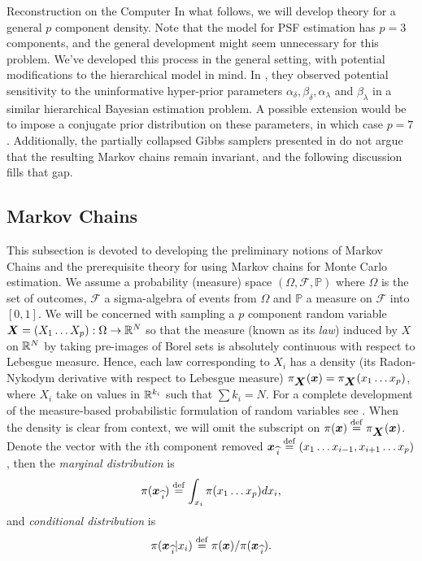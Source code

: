 \begin{chapter}{Reconstruction on the Computer}
In what follows, we will develop theory for a general $p$ component density.
Note that the model for PSF estimation has $p=3$ components, and the general development might seem unnecessary for this problem.
We've developed this process in the general setting, with potential modifications to the hierarchical model in mind.
In \citep{howard2015Sensitivity}, they observed potential sensitivity to the uninformative hyper-prior parameters $\alpha_\delta,\beta_\delta,\alpha_\lambda$ and $\beta_\lambda$ in a similar hierarchical Bayesian estimation problem.
A possible extension would be to impose a conjugate prior distribution on these parameters, in which case $p=7$.
Additionally, the partially collapsed Gibbs samplers presented in \citep{van2015metropolis,van2008partially} do not argue that the resulting Markov chains remain invariant, and the following discussion fills that gap.

  \subsection{Markov Chains}
This subsection is devoted to developing the preliminary notions of Markov Chains and the prerequisite theory for using Markov chains for Monte Carlo estimation. 
We assume a probability (measure) space $(\Omega,\mathcal F,\mathbb P)$ where $\Omega$ is the set of outcomes, $\mathcal F$ a sigma-algebra of events from $\Omega$ and $\mathbb P$ a measure on $\mathcal F$ into $[0,1]$.
We will be concerned with sampling a $p$ component random variable $\mbox{\boldmath$X$} = (X_1\dots X_p):\Omega \to \mathbb R^N$ so that the measure (known as its \emph{law}) induced by $X$ on $\mathbb R^N$ by taking pre-images of Borel sets is absolutely continuous with respect to Lebesgue measure.
Hence, each law corresponding to $X_i$ has a density (its Radon-Nykodym derivative with respect to Lebesgue measure) $\pi_{\mbox{\boldmath$X$}}(\mbox{\boldmath$x$}) = \pi_{\mbox{\boldmath$X$}}(x_1\dots x_p)$, where $X_i$ take on values in $\mathbb R^{k_i}$ such that $\sum k_i = N$.
For a complete development of the measure-based probabilistic formulation of random variables see \citep{durrett2010probability,billingsley2008probability}.
When the density is clear from context, we will omit the subscript on $\pi(\mbox{\boldmath$x$}) \stackrel{\rm def}{=} \pi_{\mbox{\boldmath$X$}}(\mbox{\boldmath$x$})$.
Denote the vector with the $i$th component removed $\mbox{\boldmath$x$}_{\,\widehat{i}} \stackrel{\rm def}{=} (x_1\dots x_{i-1},x_{i+1}\dots x_p)$, then the \emph{marginal distribution} is
\begin{equation}
  \pi(\mbox{\boldmath$x$}_{\,\widehat{i}}) \stackrel{\rm def}{=} \int_{x_i} \pi(x_1\dots x_p)dx_i,
\end{equation}
and \emph{conditional distribution} is
\begin{equation}
  \pi(\mbox{\boldmath$x$}_{\,\widehat{i}}| x_i) \stackrel{\rm def}{=} \pi(\mbox{\boldmath$x$})/\pi(\mbox{\boldmath$x$}_{\,\widehat{i}}).
\end{equation}
  

\end{chapter}
